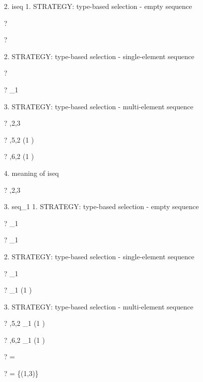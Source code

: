 \documentclass{article}
\begin{document}
 2. iseq
     1. STRATEGY: type-based selection - empty sequence
\begin{zed} \vdash? \langle \rangle \in \iseq \nat \end{zed}
\begin{zed} \vdash? \langle \rangle \in \iseq \langle\rangle \end{zed}
     2. STRATEGY: type-based selection - single-element sequence
\begin{zed} \vdash?  \rangle \in \iseq \nat \end{zed}
\begin{zed} \vdash?  \rangle \notin \iseq \nat_1 \end{zed}
     3. STRATEGY: type-based selection - multi-element sequence
\begin{zed} \vdash? ,2,3 \rangle \in \iseq \nat \end{zed}
\begin{zed} \vdash? ,5,2 \rangle \in \iseq (1 ) \end{zed}
\begin{zed} \vdash? ,6,2 \rangle \notin \iseq (1 ) \end{zed}
     4. meaning of iseq
\begin{zed} \vdash? ,2,3 \rangle \notin \iseq \nat \end{zed}

 3. seq_1
     1. STRATEGY: type-based selection - empty sequence
\begin{zed} \vdash? \langle \rangle \notin \seq_1 \nat \end{zed}
\begin{zed} \vdash? \langle \rangle \notin \seq_1 \langle\rangle \end{zed}
     2. STRATEGY: type-based selection - single-element sequence
\begin{zed} \vdash?  \rangle \in \seq_1 \nat \end{zed}
\begin{zed} \vdash?  \rangle \in \seq_1 (1 ) \end{zed}
     3. STRATEGY: type-based selection - multi-element sequence
\begin{zed} \vdash? ,5,2 \rangle \in \seq_1 (1 ) \end{zed}
\begin{zed} \vdash? ,6,2 \rangle \notin \seq_1 (1 ) \end{zed}

\begin{zed} \vdash? \langle \rangle = \emptyset[\power\arithmos] \end{zed}
\begin{zed} \vdash?  \rangle = \{(1,3)\} \end{zed}
\end{document}
